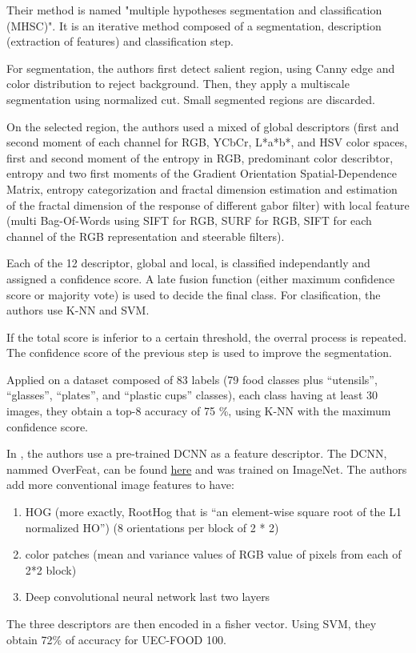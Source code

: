 Their method is named "multiple hypotheses segmentation and classification (MHSC)". It is an iterative method composed of a segmentation, description (extraction of features) and classification step.

For segmentation, the authors first detect salient region, using Canny edge and color distribution to reject background. Then, they apply a multiscale segmentation using normalized cut. Small segmented regions are discarded.

On the selected region, the authors used a mixed of global descriptors (first and second moment of each channel for RGB, YCbCr, L*a*b*, and HSV color spaces, first and second moment of the entropy in RGB, predominant color describtor, entropy and two first moments of the Gradient Orientation Spatial-Dependence Matrix, entropy categorization and fractal dimension estimation and estimation of the fractal dimension of the response of different gabor filter) with local feature (multi Bag-Of-Words using SIFT for RGB, SURF for RGB, SIFT for each channel of the RGB representation and steerable filters).

Each of the 12 descriptor, global and local, is classified independantly and assigned a confidence score. A late fusion function (either maximum confidence score or majority vote) is used  to decide the final class. For clasification, the authors use K-NN and SVM.

If the total score is inferior to a certain threshold, the overral process is repeated. The confidence score of the previous step is used to improve the segmentation.

Applied on a dataset composed of 83 labels (79 food classes plus \enquote{utensils}, \enquote{glasses}, \enquote{plates}, and \enquote{plastic cups} classes), each class having at least 30 images, they obtain a top-8 accuracy of 75 \%, using K-NN with the maximum confidence score.


In \cite{Kawano2014}, the authors use a pre-trained DCNN as a feature descriptor. The DCNN, nammed OverFeat, can be found  \href{http://cilvr.nyu.edu/doku.php?id=code:start}{here} and was trained on ImageNet.
The authors add more conventional image features to have: 
\begin{enumerate}
    \item HOG (more exactly, RootHog that is “an element-wise square root of the L1 normalized HO”) (8 orientations per block of 2 * 2)
    \item color patches (mean and variance values of  RGB value of pixels from each of 2*2  block)
    \item Deep convolutional neural network last two layers
\end{enumerate}
The three descriptors are then encoded in a fisher vector.
Using SVM, they obtain 72\% of accuracy for UEC-FOOD 100.

